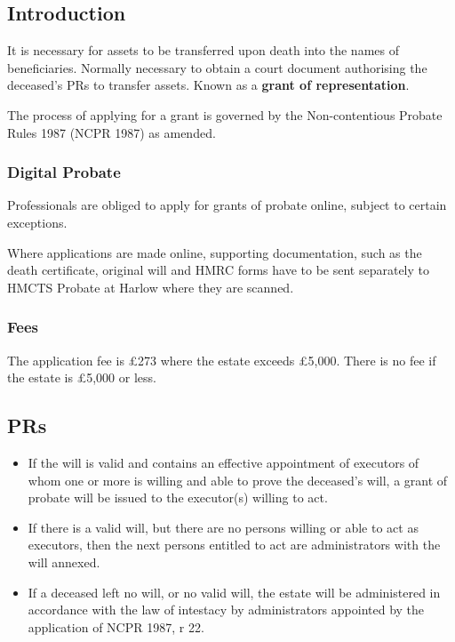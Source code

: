 \documentclass[
]{article}
\providecommand{\tightlist}{%
  \setlength{\itemsep}{0pt}\setlength{\parskip}{0pt}}
\begin{document}
\hypertarget{introduction-1}{%
\subsection{Introduction}\label{introduction-1}}

It is necessary for assets to be transferred upon death into the names
of beneficiaries. Normally necessary to obtain a court document
authorising the deceased's PRs to transfer assets. Known as a
\textbf{grant of representation}.

The process of applying for a grant is governed by the Non-contentious
Probate Rules 1987 (NCPR 1987) as amended.

\hypertarget{digital-probate}{%
\subsubsection{Digital Probate}\label{digital-probate}}

Professionals are obliged to apply for grants of probate online, subject
to certain exceptions.

Where applications are made online, supporting documentation, such as
the death certificate, original will and HMRC forms have to be sent
separately to HMCTS Probate at Harlow where they are scanned.

\hypertarget{fees}{%
\subsubsection{Fees}\label{fees}}

The application fee is £273 where the estate exceeds £5,000. There is no
fee if the estate is £5,000 or less.

\hypertarget{prs-1}{%
\subsection{PRs}\label{prs-1}}

\begin{itemize}
\tightlist
\item
  If the will is valid and contains an effective appointment of
  executors of whom one or more is willing and able to prove the
  deceased's will, a grant of probate will be issued to the executor(s)
  willing to act.
\item
  If there is a valid will, but there are no persons willing or able to
  act as executors, then the next persons entitled to act are
  administrators with the will annexed.
\item
  If a deceased left no will, or no valid will, the estate will be
  administered in accordance with the law of intestacy by administrators
  appointed by the application of NCPR 1987, r 22.
\end{itemize}
\end{document}
